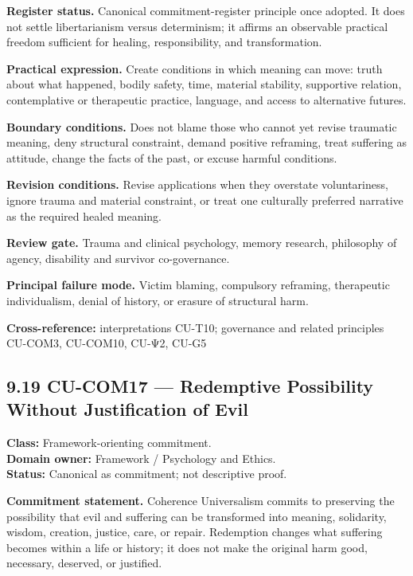 \documentclass[
  11pt,
]{article}
\begin{document}
\textbf{Register status.} Canonical commitment-register principle once
adopted. It does not settle libertarianism versus determinism; it
affirms an observable practical freedom sufficient for healing,
responsibility, and transformation.

\textbf{Practical expression.} Create conditions in which meaning can
move: truth about what happened, bodily safety, time, material
stability, supportive relation, contemplative or therapeutic practice,
language, and access to alternative futures.

\textbf{Boundary conditions.} Does not blame those who cannot yet revise
traumatic meaning, deny structural constraint, demand positive
reframing, treat suffering as attitude, change the facts of the past, or
excuse harmful conditions.

\textbf{Revision conditions.} Revise applications when they overstate
voluntariness, ignore trauma and material constraint, or treat one
culturally preferred narrative as the required healed meaning.

\textbf{Review gate.} Trauma and clinical psychology, memory research,
philosophy of agency, disability and survivor co-governance.

\textbf{Principal failure mode.} Victim blaming, compulsory reframing,
therapeutic individualism, denial of history, or erasure of structural
harm.

\textbf{Cross-reference:} interpretations CU-T10; governance and related
principles CU-COM3, CU-COM10, CU-Ψ2, CU-G5

\subsection{9.19 CU-COM17 --- Redemptive Possibility Without
Justification of
Evil}\label{cu-com17-redemptive-possibility-without-justification-of-evil}

\textbf{Class:} Framework-orienting commitment.\\
\textbf{Domain owner:} Framework / Psychology and Ethics.\\
\textbf{Status:} Canonical as commitment; not descriptive proof.

\textbf{Commitment statement.} Coherence Universalism commits to
preserving the possibility that evil and suffering can be transformed
into meaning, solidarity, wisdom, creation, justice, care, or repair.
Redemption changes what suffering becomes within a life or history; it
does not make the original harm good, necessary, deserved, or justified.
\end{document}
